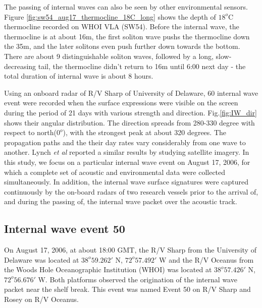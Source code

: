 %
%
The passing of internal waves can also be seen by other environmental sensors. 
Figure \ref{fig:sw54_aug17_thermocline_18C_long} shows the depth of $18^o$C thermocline recorded on WHOI VLA (SW54). Before the internal wave, the thermocline is at about 16m, the first soliton wave pushs the thermocline down the 35m, and the later solitons even push further down towards the bottom. There are about 9 distinguishable soliton waves, followed by a long, slow-decreasing tail, the thermocline didn't return to 16m until 6:00 next day - the total duration of internal wave is about 8 hours.


Using an onboard radar of R/V Sharp of University of Delaware, 60 internal wave event were recorded when the surface expressions were visible on the screen during the period of 21 days with various strength and direction. Fig.\ref{fig:IW_dir} shows their angular distribution. The direction spreads from 280-330 degree with respect to north($0^o$), with the strongest peak at about 320 degrees. The propagation paths and the their day rates vary considerably from one wave to another. Lynch {\it et al} \cite{intro_Lynch_2010} reported a similar results by studying satellite imagery. In this study, we focus on a particular internal wave event on August 17, 2006, for which a complete set of acoustic and environmental data were collected simultaneously. In addition, the internal wave surface signatures were
captured continuously by the on-board radars of two research vessels
prior to the arrival of, and during the passing of, the internal wave packet
over the acoustic track.

 

\subsection{Internal wave event 50}
On August 17, 2006, at about 18:00 GMT, the R/V Sharp from the
University of Delaware was located at $38^o59.262'$ N, $72^o57.492'$ W and
the R/V Oceanus from the Woods Hole Oceanographic Institution (WHOI)
was located at $38^o57.426'$ N, $72^o56.676'$ W. Both platforms observed
the origination of the internal wave packet near the shelf break. This event was named
Event 50 on R/V Sharp and Rosey on R/V Oceanus.


